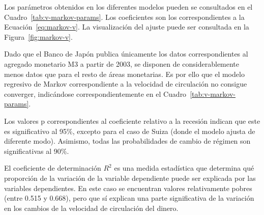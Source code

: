 \documentclass[titlepage, 12pt]{article}
\begin{document}
Los parámetros obtenidos en los diferentes modelos pueden se consultados en el Cuadro~\ref{tab:v-markov-params}. Los coeficientes son los correspondientes a la Ecuación~\ref{eq:markov-v}. La visualización del ajuste puede ser consultada en la Figura~\ref{fig:markov-v}.

Dado que el Banco de Japón publica únicamente los datos correspondientes al agregado monetario M3 a partir de 2003, se disponen de considerablemente menos datos que para el resto de áreas monetarias. Es por ello que el modelo regresivo de Markov correspondiente a la velocidad de circulación no consigue converger, indicándose correspondientemente en el Cuadro~\ref{tab:v-markov-params}.

Los valores p correspondientes al coeficiente relativo a la recesión indican que este es significativo al 95\%, excepto para el caso de Suiza (donde el modelo ajusta de diferente modo). Asimismo, todas las probabilidades de cambio de régimen son significativas al 90\%.

El coeficiente de determinación $R^2$ es una medida estadística que determina qué proporción de la variación de la variable dependiente puede ser explicada por las variables dependientes. En este caso se encuentran valores relativamente pobres (entre 0.515 y 0.668), pero que sí explican una parte significativa de la variación en los cambios de la velocidad de circulación del dinero.
\end{document}
